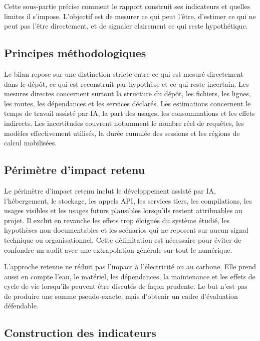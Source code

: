 \documentclass[
  10pt,
  a4paper,
  DIV=11,
  numbers=noendperiod,
  oneside]{scrreprt}
\begin{document}
Cette sous-partie précise comment le rapport construit ses indicateurs
et quelles limites il s'impose. L'objectif est de mesurer ce qui peut
l'être, d'estimer ce qui ne peut pas l'être directement, et de signaler
clairement ce qui reste hypothétique.

\subsection{Principes
méthodologiques}\label{principes-muxe9thodologiques}

Le bilan repose sur une distinction stricte entre ce qui est mesuré
directement dans le dépôt, ce qui est reconstruit par hypothèse et ce
qui reste incertain. Les mesures directes concernent surtout la
structure du dépôt, les fichiers, les lignes, les routes, les
dépendances et les services déclarés. Les estimations concernent le
temps de travail assisté par IA, la part des usages, les consommations
et les effets indirects. Les incertitudes couvrent notamment le nombre
réel de requêtes, les modèles effectivement utilisés, la durée cumulée
des sessions et les régions de calcul mobilisées.

\subsection{Périmètre d'impact
retenu}\label{puxe9rimuxe8tre-dimpact-retenu}

Le périmètre d'impact retenu inclut le développement assisté par IA,
l'hébergement, le stockage, les appels API, les services tiers, les
compilations, les usages visibles et les usages futurs plausibles
lorsqu'ils restent attribuables au projet. Il exclut en revanche les
effets trop éloignés du système étudié, les hypothèses non documentables
et les scénarios qui ne reposent sur aucun signal technique ou
organisationnel. Cette délimitation est nécessaire pour éviter de
confondre un audit avec une extrapolation générale sur tout le
numérique.

L'approche retenue ne réduit pas l'impact à l'électricité ou au carbone.
Elle prend aussi en compte l'eau, le matériel, les dépendances, la
maintenance et les effets de cycle de vie lorsqu'ils peuvent être
discutés de façon prudente. Le but n'est pas de produire une somme
pseudo-exacte, mais d'obtenir un cadre d'évaluation défendable.

\subsection{Construction des
indicateurs}\label{construction-des-indicateurs}
\end{document}
